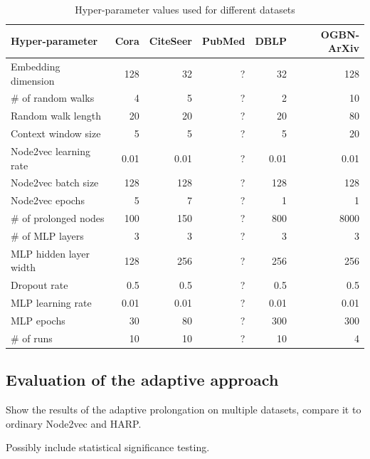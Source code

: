 \begin{table}
  \caption{Hyper-parameter values used for different datasets}
  \label{tab:hyperparameter-values}
  \begin{tabular}{lrrrrr}
    \toprule
    Hyper-parameter        & Cora & CiteSeer & PubMed & DBLP & OGBN-ArXiv \\
    \midrule
    Embedding dimension    & 128  & 32       & ?      & 32   & 128        \\
    \# of random walks     & 4    & 5        & ?      & 2    & 10         \\
    Random walk length     & 20   & 20       & ?      & 20   & 80         \\
    Context window size    & 5    & 5        & ?      & 5    & 20         \\
    Node2vec learning rate & 0.01 & 0.01     & ?      & 0.01 & 0.01       \\
    Node2vec batch size    & 128  & 128      & ?      & 128  & 128        \\
    Node2vec epochs        & 5    & 7        & ?      & 1    & 1          \\
    \# of prolonged nodes  & 100  & 150      & ?      & 800  & 8000       \\
    \# of MLP layers       & 3    & 3        & ?      & 3    & 3          \\
    MLP hidden layer width & 128  & 256      & ?      & 256  & 256        \\
    Dropout rate           & 0.5  & 0.5      & ?      & 0.5  & 0.5        \\
    MLP learning rate      & 0.01 & 0.01     & ?      & 0.01 & 0.01       \\
    MLP epochs             & 30   & 80       & ?      & 300  & 300        \\
    \# of runs             & 10   & 10       & ?      & 10   & 4          \\
    \bottomrule
  \end{tabular}
\end{table}

\subsection{Evaluation of the adaptive approach}
Show the results of the adaptive prolongation on multiple datasets, compare it to ordinary Node2vec and HARP.

Possibly include statistical significance testing.

